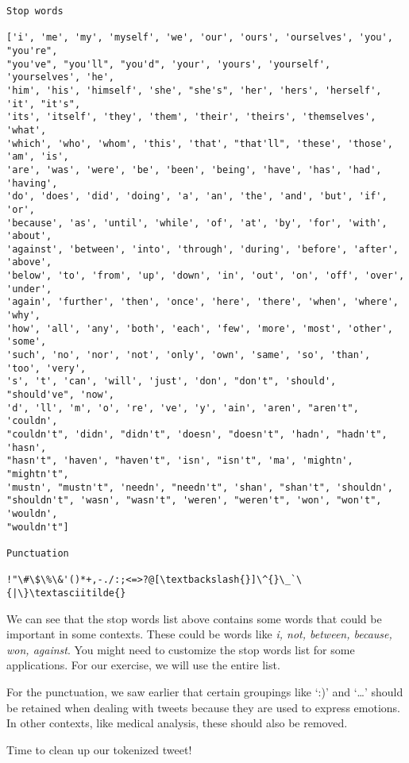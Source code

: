 \documentclass[11pt]{article}
\begin{document}
    \begin{Verbatim}[commandchars=\\\{\}]
Stop words

['i', 'me', 'my', 'myself', 'we', 'our', 'ours', 'ourselves', 'you', "you're",
"you've", "you'll", "you'd", 'your', 'yours', 'yourself', 'yourselves', 'he',
'him', 'his', 'himself', 'she', "she's", 'her', 'hers', 'herself', 'it', "it's",
'its', 'itself', 'they', 'them', 'their', 'theirs', 'themselves', 'what',
'which', 'who', 'whom', 'this', 'that', "that'll", 'these', 'those', 'am', 'is',
'are', 'was', 'were', 'be', 'been', 'being', 'have', 'has', 'had', 'having',
'do', 'does', 'did', 'doing', 'a', 'an', 'the', 'and', 'but', 'if', 'or',
'because', 'as', 'until', 'while', 'of', 'at', 'by', 'for', 'with', 'about',
'against', 'between', 'into', 'through', 'during', 'before', 'after', 'above',
'below', 'to', 'from', 'up', 'down', 'in', 'out', 'on', 'off', 'over', 'under',
'again', 'further', 'then', 'once', 'here', 'there', 'when', 'where', 'why',
'how', 'all', 'any', 'both', 'each', 'few', 'more', 'most', 'other', 'some',
'such', 'no', 'nor', 'not', 'only', 'own', 'same', 'so', 'than', 'too', 'very',
's', 't', 'can', 'will', 'just', 'don', "don't", 'should', "should've", 'now',
'd', 'll', 'm', 'o', 're', 've', 'y', 'ain', 'aren', "aren't", 'couldn',
"couldn't", 'didn', "didn't", 'doesn', "doesn't", 'hadn', "hadn't", 'hasn',
"hasn't", 'haven', "haven't", 'isn', "isn't", 'ma', 'mightn', "mightn't",
'mustn', "mustn't", 'needn', "needn't", 'shan', "shan't", 'shouldn',
"shouldn't", 'wasn', "wasn't", 'weren', "weren't", 'won', "won't", 'wouldn',
"wouldn't"]

Punctuation

!"\#\$\%\&'()*+,-./:;<=>?@[\textbackslash{}]\^{}\_`\{|\}\textasciitilde{}
    \end{Verbatim}

    We can see that the stop words list above contains some words that could
be important in some contexts. These could be words like \emph{i, not,
between, because, won, against}. You might need to customize the stop
words list for some applications. For our exercise, we will use the
entire list.

For the punctuation, we saw earlier that certain groupings like `:)' and
`\ldots{}' should be retained when dealing with tweets because they are
used to express emotions. In other contexts, like medical analysis,
these should also be removed.

Time to clean up our tokenized tweet!
\end{document}

